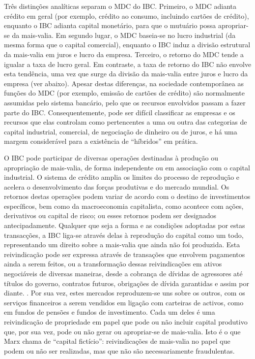 Três distinções analíticas separam o MDC do IBC. Primeiro, o MDC adianta crédito em geral (por exemplo, crédito ao consumo, incluindo cartões de crédito), enquanto o IBC adianta capital monetário, para que o mutuário possa apropriar-se da mais-valia. Em segundo lugar, o MDC baseia-se no lucro industrial (da mesma forma que o capital comercial), enquanto o IBC induz a divisão estrutural da mais-valia em juros e lucro da empresa. Terceiro, o retorno do MDC tende a igualar a taxa de lucro geral. Em contraste, a taxa de retorno do IBC não envolve esta tendência, uma vez que surge da divisão da mais-valia entre juros e lucro da empresa (ver abaixo). Apesar destas diferenças, na sociedade contemporânea as funções do MDC (por exemplo, emissão de cartões de crédito) são normalmente assumidas pelo sistema bancário, pelo que os recursos envolvidos passam a fazer parte do IBC. Consequentemente, pode ser difícil classificar as empresas e os recursos que elas controlam como pertencentes a uma ou outra das categorias de capital industrial, comercial, de negociação de dinheiro ou de juros, e há uma margem considerável para a existência de “híbridos” em prática.
 \par 
O IBC pode participar de diversas operações destinadas à produção ou apropriação de mais-valia, de forma independente ou em associação com o capital industrial. O sistema de crédito amplia os limites do processo de reprodução e acelera o desenvolvimento das forças produtivas e do mercado mundial. Os retornos destas operações podem variar de acordo com o destino de investimentos específicos, bem como da macroeconomia capitalista, como acontece com ações, derivativos ou capital de risco; ou esses retornos podem ser designados antecipadamente. Qualquer que seja a forma e as condições adoptadas por estas transacções, a IBC liga-se através delas à reprodução do capital como um todo, representando um direito sobre a mais-valia que ainda não foi produzida. Esta reivindicação pode ser expressa através de transações que envolvem pagamentos ainda a serem feitos, ou a transformação dessas reivindicações em ativos negociáveis ​​de diversas maneiras, desde a cobrança de dívidas de agressores até títulos do governo, contratos futuros, obrigações de dívida garantidas e assim por diante. . Por sua vez, estes mercados reproduzem-se uns sobre os outros, com os serviços financeiros a serem vendidos em ligação com carteiras de activos, como em fundos de pensões e fundos de investimento. Cada um deles é uma reivindicação de propriedade em papel que pode ou não incluir capital produtivo que, por sua vez, pode ou não gerar ou apropriar-se de mais-valia. Isto é o que Marx chama de “capital fictício”: reivindicações de mais-valia no papel que podem ou não ser realizadas, mas que não são necessariamente fraudulentas.
